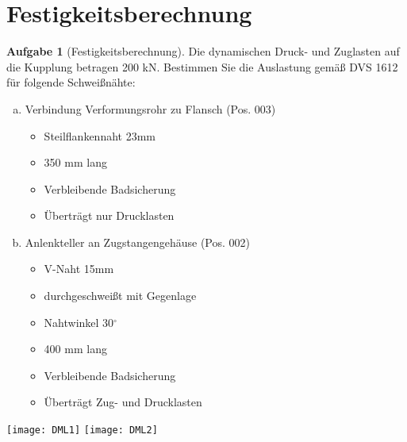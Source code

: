 \documentclass[10pt,a4paper,headsepline,smallheadings]{scrartcl}
\theoremstyle{definition}
\newtheorem{aufgabe}{Aufgabe}
\begin{document}
\section*{Festigkeitsberechnung}
\begin{aufgabe}[Festigkeitsberechnung] 
Die dynamischen Druck- und Zuglasten auf die Kupplung betragen 200 kN. Bestimmen Sie die Auslastung gem\"a{\ss} DVS 1612 f\"ur folgende Schwei{\ss}n\"ahte:
 \begin{enumerate}[a)]
\item Verbindung Verformungsrohr zu Flansch (Pos. 003)
\begin{itemize}
		\item Steilflankennaht 23mm
		\item 350 mm lang
		\item Verbleibende Badsicherung
		\item \"Ubertr\"agt nur Drucklasten
\end{itemize}
\item Anlenkteller an Zugstangengeh\"ause (Pos. 002)
\begin{itemize}
		\item V-Naht 15mm
		\item durchgeschwei{\ss}t mit Gegenlage
		\item Nahtwinkel 30$^\circ$
		\item 400 mm lang
		\item Verbleibende Badsicherung
		\item \"Ubertr\"agt Zug- und Drucklasten
\end{itemize}

\end{enumerate}
\end{aufgabe}


\begin{landscape}
\begin{center}
\texttt{[image: DML1]}
\newpage
\texttt{[image: DML2]}
\end{center}
\end{landscape}
\end{document}
